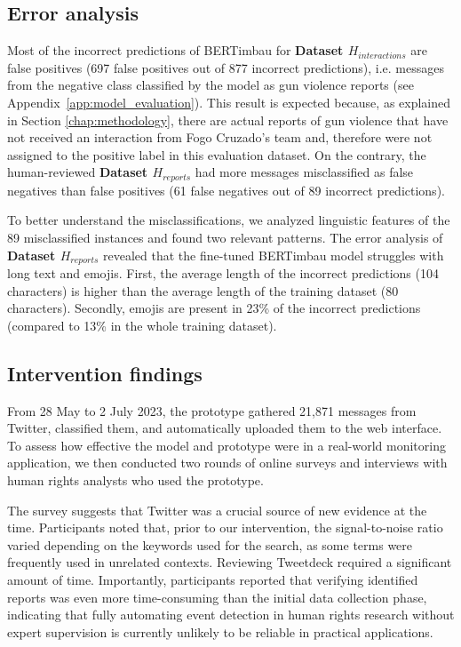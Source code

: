 \documentclass[11pt,letterpaper]{article}
\begin{document}
\subsection{Error analysis}
Most of the incorrect predictions of BERTimbau for \textbf{Dataset $ H_{interactions}$} are false positives (697 false positives out of 877 incorrect predictions), i.e. messages from the negative class classified by the model as gun violence reports (see Appendix~\ref{app:model_evaluation}). This result is expected because, as explained in Section \ref{chap:methodology}, there are actual reports of gun violence that have not received an interaction from Fogo Cruzado's team and, therefore were not assigned to the positive label in this evaluation dataset. On the contrary, the human-reviewed \textbf{Dataset $ H_{reports}$} had more messages misclassified as false negatives than false positives (61 false negatives out of 89 incorrect predictions).

To better understand the misclassifications, we analyzed linguistic features of the 89 misclassified instances and found two relevant patterns. The error analysis of \textbf{Dataset $ H_{reports}$} revealed that the fine-tuned BERTimbau model struggles with long text and emojis. First, the average length of the incorrect predictions (104 characters) is higher than the average length of the training dataset (80 characters). Secondly, emojis are present in 23\% of the incorrect predictions (compared to 13\% in the whole training dataset). 

\subsection{Intervention findings}
\label{subchap:results-intervention}

From 28 May to 2 July 2023, the prototype gathered 21,871 messages from Twitter, classified them, and automatically uploaded them to the web interface. To assess how effective the model and prototype were in a real-world monitoring application, we then conducted two rounds of online surveys and interviews with human rights analysts who used the prototype.

The survey suggests that Twitter was a crucial source of new evidence at the time. Participants noted that, prior to our intervention, the signal-to-noise ratio varied depending on the keywords used for the search, as some terms were frequently used in unrelated contexts. Reviewing Tweetdeck required a significant amount of time. Importantly, participants reported that verifying identified reports was even more time-consuming than the initial data collection phase, indicating that fully automating event detection in human rights research without expert supervision is currently unlikely to be reliable in practical applications. 
\end{document}

